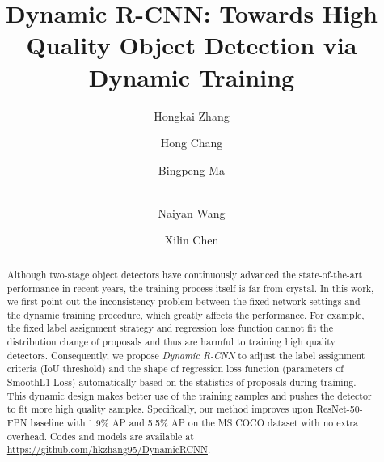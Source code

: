 \documentclass[runningheads]{llncs}
\begin{document}
\pagestyle{headings}
\mainmatter
\def\ECCVSubNumber{2335}  

\title{Dynamic R-CNN: Towards High Quality Object Detection via Dynamic Training} 

\begin{comment}
\titlerunning{ECCV-20 submission ID \ECCVSubNumber}
\authorrunning{ECCV-20 submission ID \ECCVSubNumber}
\author{Anonymous ECCV submission}
\institute{Paper ID \ECCVSubNumber}
\end{comment}


\author{Hongkai Zhang \and
Hong Chang \and
Bingpeng Ma \and\\
Naiyan Wang \and
Xilin Chen}
\maketitle

\begin{abstract}
    Although two-stage object detectors have continuously advanced the state-of-the-art performance in recent years, the training process itself is far from crystal. In this work, we first point out the inconsistency problem between the fixed network settings and the dynamic training procedure, which greatly affects the performance. For example, the fixed label assignment strategy and regression loss function cannot fit the distribution change of proposals and thus are harmful to training high quality detectors.
    Consequently, we propose \emph{Dynamic R-CNN} to adjust the label assignment criteria (IoU threshold) and the shape of regression loss function (parameters of SmoothL1 Loss) automatically based on the statistics of proposals during training. This dynamic design makes better use of the training samples and pushes the detector to fit more high quality samples. Specifically, our method improves upon ResNet-50-FPN baseline with 1.9\% AP and 5.5\% AP on the MS COCO dataset with no extra overhead. Codes and models are available at \url{https://github.com/hkzhang95/DynamicRCNN}.
\end{abstract}
\end{document}
